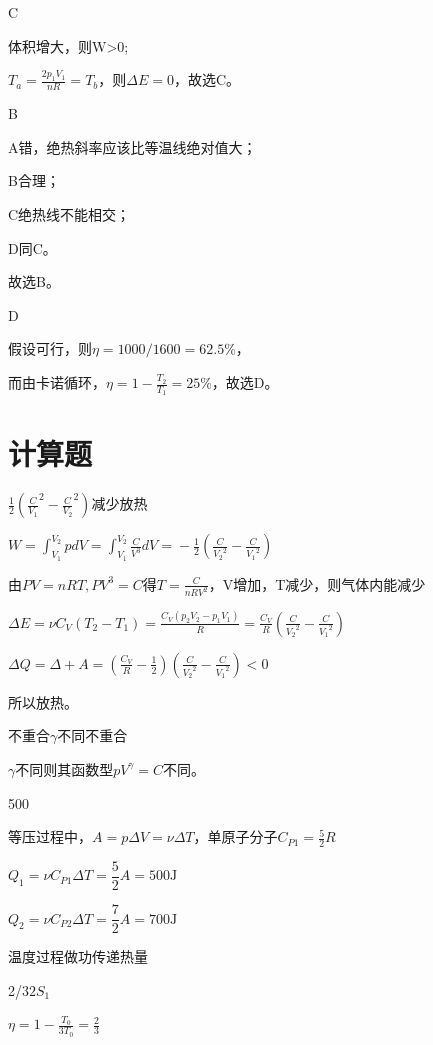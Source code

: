\documentclass[b5paper,opensource]{./template/qyxf-book}
\begin{document}
C

\solve 体积增大，则W>0;

$T_a=\frac{2p_1V_1}{nR}=T_b$，则$\Delta E=0$，故选C。

B

\solve A错，绝热斜率应该比等温线绝对值大；

B合理；

C绝热线不能相交；

D同C。

故选B。

D

\solve 假设可行，则$\eta=1000/1600=62.5\%$，

而由卡诺循环，$\eta=1-\frac{T_2}{T_1}=25\%$，故选D。

\section{计算题}
$\frac{1}{2}(\frac{C}{V_1}^2-\frac{C}{V_2}^2)$\qquad 减少\qquad 放热

\solve $W = \int_{{V_1}}^{{V_2}} {pdV = } \int_{{V_1}}^{{V_2}} {\frac{C}{{{V^3}}}dV = }  - \frac{1}{2}(\frac{C}{{{V_2}^2}} - \frac{C}{{{V_1}^2}})$

由$PV = nRT,P{V^3} = C$得$T=\frac{C}{nRV^2}$，V增加，T减少，则气体内能减少

$\Delta E = \nu {C_V}({T_2} - {T_1}) = \frac{{{C_V}({p_2}{V_2} - {p_1}{V_1})}}{R} = \frac{{{C_V}}}{R}(\frac{C}{{{V_2}^2}} - \frac{C}{{{V_1}^2}})$

$\Delta Q = \Delta  + A = (\frac{{{C_V}}}{R} - \frac{1}{2})(\frac{C}{{{V_2}^2}} - \frac{C}{{{V_1}^2}}) < 0$

所以放热。

不重合\qquad$\gamma$不同\qquad 不重合

\solve
$\gamma$不同则其函数型$pV^\gamma=C$不同。

500

\solve 
等压过程中，$A=p\Delta V=\nu \Delta T$，单原子分子$C_{P1}=\frac{5}{2}R$

$Q_1=\nu C_{P1} \Delta T=\dfrac{5}{2}A=500\mathrm{J}$

$Q_2=\nu C_{P2} \Delta T=\dfrac{7}{2}A=700\mathrm{J}$

温度\qquad 过程\qquad 做功\qquad 传递热量

2/3\qquad$2S_1$

\solve
$\eta =1-\frac{T_0}{3T_0}=\frac{2}{3}$
\end{document}
